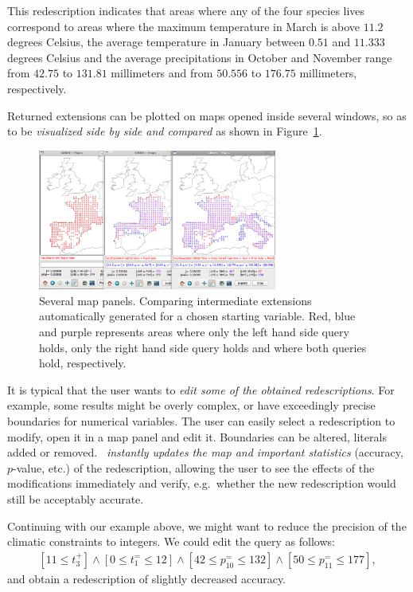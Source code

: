 This redescription indicates that areas where any of the four species
lives correspond to areas where the maximum temperature in March is
above $11.2$ degrees Celsius, the average temperature in January
between $0.51$ and $11.333$ degrees Celsius and the average
precipitations in October and November range from $42.75$ to $131.81$
millimeters and from $50.556$ to $176.75$ millimeters, respectively.

Returned extensions can be plotted on maps opened inside several
windows, so as to be \emph{visualized side by side and compared} as shown in
Figure~\ref{fig:comparison}.

\begin{figure}
  \centering
\includegraphics[width=0.7\textwidth]{screenshots/comparison}
  \caption{Several map panels. Comparing intermediate extensions automatically generated for a chosen starting variable. Red, blue and purple represents areas where only the left hand side query holds, only the right hand side query holds and where both queries hold, respectively.}
  \label{fig:comparison}
\end{figure}


 It is typical that the user wants to
\emph{edit some of the obtained redescriptions}. For example, some results
might be overly complex, or have exceedingly precise boundaries for
numerical variables. The user can easily select a redescription to
modify, open it in a map panel and edit it. Boundaries can be altered,
literals added or removed. \Siren\ \emph{instantly updates the map and important
statistics} (accuracy, $p$-value, etc.) of the redescription, allowing
the user to see the effects of the modifications immediately and
verify, e.g.\ whether the new redescription would still be acceptably
accurate.

Continuing with our example above, we might want to reduce the
precision of the climatic constraints to integers. We could edit the
query as follows:
\begin{equation*}
\begin{array}{l}
[11 \leq t_{3}^{+}] \land  [0 \leq t_{1}^{=} \leq 12]%
\land  [42 \leq p_{10}^{=} \leq 132] \land [50 \leq p_{11}^{=} \leq 177],
\end{array}
\end{equation*}
and obtain a redescription of slightly decreased accuracy. %

